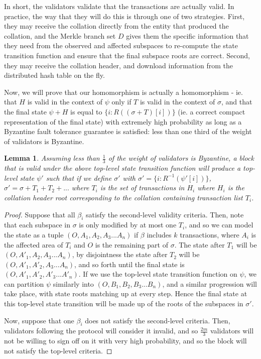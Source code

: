 \documentclass[11pt,a4paper]{article}
\theoremstyle{plain}
\newtheorem{lem}[thm]{Lemma}
\theoremstyle{definition}
\theoremstyle{remark}
\begin{document}
In short, the validators validate that the transactions are actually valid. In practice, the way that they will do this is through one of two strategies. First, they may receive the collation directly from the entity that produced the collation, and the Merkle branch set $D$ gives them the specific information that they need from the observed and affected subspaces to re-compute the state transition function and ensure that the final subspace roots are correct. Second, they may receive the collation header, and download information from the distributed hash table on the fly.

Now, we will prove that our homomorphism is actually a homomorphism - ie. that $H$ is valid in the context of $\psi$ only if $T$ is valid in the context of $\sigma$, and that the final state $\psi + H$ is equal to $\{i: R((\sigma + T)[i])\}$ (ie. a correct compact representation of the final state) with extremely high probability as long as a Byzantine fault tolerance guarantee is satisfied: less than one third of the weight of validators is Byzantine. 

\begin{lem}
Assuming less than $\frac{1}{3}$ of the weight of validators is Byzantine, a block that is valid under the above top-level state transition function will produce a top-level state $\psi'$ such that if we define $\sigma'$ with $\sigma' = \{i: R^{-1}(\psi'[i])\}$, $\sigma' = \sigma + T_1 + T_2 + ...$ where $T_i$ is the set of transactions in $H_i$ where $H_i$ is the collation header root corresponding to the collation containing transaction list $T_i$.
\end{lem}

\begin{proof}
Suppose that all $\beta_i$ satisfy the second-level validity criteria. Then, note that each subspace in $\sigma$ is only modified by at most one $T_i$, and so we can model the state as a tuple $(O, A_1, A_2, A_3 ... A_n)$ if $\beta$ includes $k$ transactions, where $A_i$ is the affected area of $T_i$ and $O$ is the remaining part of $\sigma$. The state after $T_1$ will be $(O, A'_1, A_2, A_3 ... A_n)$, by disjointness the state after $T_2$ will be $(O, A'_1, A'_2, A_3 ... A_n)$, and so forth until the final state is $(O, A'_1, A'_2, A'_3 ... A'_n)$. If we use the top-level state transition function on $\psi$, we can partition $\psi$ similarly into $(O, B_1, B_2, B_3 ... B_n)$, and a similar progression will take place, with state roots matching up at every step. Hence the final state at this top-level state transition will be made up of the roots of the subspaces in $\sigma'$.

Now, suppose that one $\beta_i$ does not satisfy the second-level criteria. Then, validators following the protocol will consider it invalid, and so $\frac{2m}{3}$ validators will not be willing to sign off on it with very high probability, and so the block will not satisfy the top-level criteria.
\end{proof}
\end{document}
